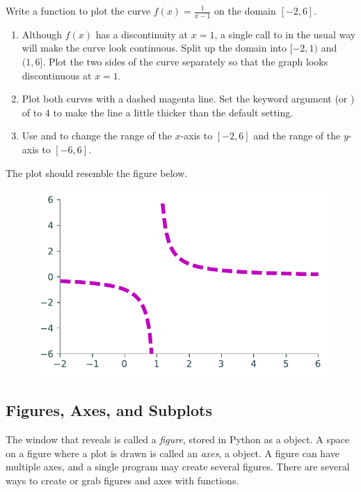 %
%
\begin{problem} %
Write a function to plot the curve $f(x) = \frac{1}{x-1}$ on the domain $[-2,6]$.
\begin{enumerate}
\item
Although $f(x)$ has a discontinuity at $x=1$, a single call to  in the usual way will make the curve look continuous.
Split up the domain into $[-2,1)$ and $(1,6]$.
Plot the two sides of the curve separately so that the graph looks discontinuous at $x=1$.
\item Plot both curves with a dashed magenta line.
Set the keyword argument  (or ) of  to $4$ to make the line a little thicker than the default setting.
\item Use  and  to change the range of the $x$-axis to $[-2,6]$ and the range of the $y$-axis to $[-6, 6]$.
\end{enumerate}
The plot should resemble the figure below.

\begin{figure}[H] %
\includegraphics[width=.5\textwidth]{figures/discontinuousProblem.pdf}
\end{figure}
\end{problem}

\subsection*{Figures, Axes, and Subplots} %

The window that  reveals is called a \emph{figure}, stored in Python as a  object.
A space on a figure where a plot is drawn is called an \emph{axes}, a  object.
A figure can have multiple axes, and a single program may create several figures.
There are several ways to create or grab figures and axes with  functions.

